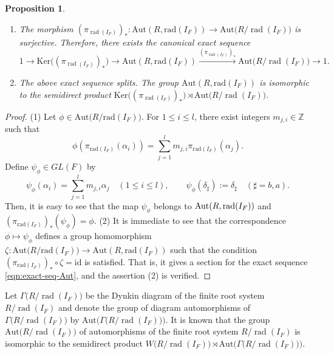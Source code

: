 \documentclass[11pt]{amsart}
\newtheorem{prop}[thm]{Proposition}%
\newcommand{\rad}{\operatorname{rad}}
\begin{document}
{\begin{prop}\label{prop:2} \hspace{0.1in} 
\begin{enumerate}
\item The morphism $(\pi_{\rad(I_F)})_*:\mathrm{Aut}(R,\mathrm{rad}(I_F))\to 
\mathrm{Aut}\big(R/\rad(I_F)\big)$ is surjective. Therefore, there exists the canonical exact 
sequence
\begin{equation}\label{eqn:exact-seq-Aut}
1\to \mathrm{Ker}\bigl((\pi_{\rad(I_F)})_* \bigr)\to 
\mathrm{Aut}(R,\mathrm{rad}(I_F))
\xrightarrow{(\pi_{\rad(I_F)})_*} \mathrm{Aut}\big(R/\rad(I_F)\big)\to 1.
\end{equation}
\item The above exact sequence splits. The group 
$\mathrm{Aut}(R,\mathrm{rad}(I_F))$ is isomorphic to the
semidirect product
$\mathrm{Ker}\bigl((\pi_{\rad(I_F)})_* \bigr)\rtimes \mathrm{Aut}\big(R/\rad (I_F)\big)$.
\end{enumerate}
\end{prop}
{
\begin{proof}
(1) Let $\phi\in \mathrm{Aut}\big(R/\mathrm{rad}(I_F)\big)$. 
For $1\leq i\leq l$, there exist integers 
$m_{j,i}\in\mathbb{Z}$ such that
\[\phi(\pi_{\mathrm{rad}(I_F)}(\alpha_i))
=\sum_{j=1}^lm_{j,i}\pi_{\mathrm{rad}(I_F)}(\alpha_j).\]  
Define $\psi_{\phi}\in {GL}(F)$ by
\[\psi_{\phi}(\alpha_i)=\sum_{j=1}^lm_{j,i}\alpha_j \quad (1\leq i\leq l),\qquad
\psi_{\phi}(\delta_{\sharp}):=\delta_{\sharp} \quad (\sharp=b,a). \]
Then, it is easy to see that the map $\psi_{\phi}$ belongs to 
$\mbox{\rm Aut}(R,\mathrm{rad}(I_F))$ and 
$(\pi_{\mathrm{rad}(I_F)})_*(\psi_{\phi})=\phi$. 
\vskip 2mm
\noindent
(2) It is immediate to see that the correspondence 
$\phi\mapsto \psi_{\phi}$ defines a group homomorphism 
$\zeta:\mathrm{Aut}\big(R/\mathrm{rad}(I_F)\big)\to 
\mathrm{Aut}(R,\mathrm{rad}(I_F))$
such that the condition
$(\pi_{\mathrm{rad}(I_F)})_*\circ \zeta=\mathrm{id}$
is satisfied. That is, it gives a section for the exact sequence \eqref{eqn:exact-seq-Aut},
and the assertion (2) is verified. 
\end{proof}
}

Let $\Gamma\big(R/\rad (I_F)\big)$ be the Dynkin diagram of the finite root system 
$R/\rad(I_F)$ and denote the group of diagram automorphisms of 
$\Gamma\big(R/\rad(I_F)\big)$  by 
$\mathrm{Aut}\big(\Gamma\big(R/\rad (I_F)\big)\big)$. 
It is known that the group $\mathrm{Aut}\big(R/\rad (I_F)\big)$ of automorphisms of 
the finite root system $R/\rad (I_F)$ is isomorphic to
the semidirect product $W\big(R/\rad(I_F)\big)\rtimes 
\mathrm{Aut}\big(\Gamma\big(R/\rad (I_F)\big)\big)$. \\

}
\end{document}
